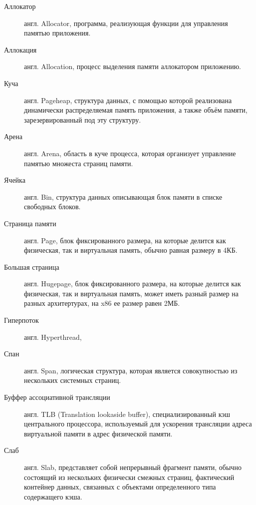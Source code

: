 \Defines %
\begin{description}
	\item[Аллокатор] англ. Allocator, программа, реализующая функции для управления памятью приложения.
	\item[Аллокация] англ. Allocation, процесс выделения памяти аллокатором приложению.
	\item[Куча] англ. Pageheap, структура данных, с помощью которой реализована динамически распределяемая память приложения, а также объём памяти, зарезервированный под эту структуру.
	\item[Арена] англ. Arena, область в куче процесса, которая организует управление памятью множеста страниц памяти.
	\item[Ячейка] англ. Bin, структура данных описывающая блок памяти в списке свободных блоков.
	\item[Страница памяти] англ. Page, блок фиксированного размера, на которые делится как физическая, так и виртуальная память, обычно равная размеру в 4КБ.
	\item[Большая страница] англ. Hugepage, блок фиксированного размера, на которые делится как физическая, так и виртуальная память, может иметь разный размер на разных архитертурах, на x86 ее размер равен 2МБ.
	\item[Гиперпоток] англ. Hyperthread, 
	\item[Спан] англ. Span, логическая структура, которая является совокупностью из нескольких системных страниц.
	\item[Буффер ассоциативной трансляции] англ. TLB (Translation lookaside buffer), специализированный кэш центрального процессора, используемый для ускорения трансляции адреса виртуальной памяти в адрес физической памяти.
	\item[Слаб] англ. Slab, представляет собой непрерывный фрагмент памяти, обычно состоящий из нескольких физически смежных страниц, фактический контейнер данных, связанных с объектами определенного типа содержащего кэша.
\end{description}

